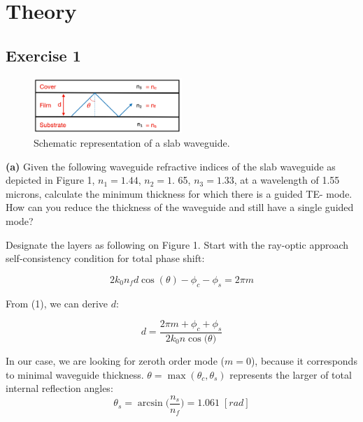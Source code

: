 \documentclass[11pt,a4paper]{article}
\begin{document}
 

\section{Theory}

\subsection*{Exercise 1}


\begin{figure}[ht]
    \centering
    \includegraphics[width=0.5\textwidth]{fig_1.png}
    \caption{Schematic representation of a slab waveguide.}
\end{figure}


\begin{displayquote}
\textbf{(a)} Given the following waveguide refractive indices of the slab waveguide as 
depicted in Figure 1, $n_1=1.44$, $n_2=1$. 65, $n_3=1.33$, at a wavelength of 1.55 microns, 
calculate the minimum thickness for which there is a guided TE- mode. How can 
you reduce the thickness of the waveguide and still have a single guided mode? 
\end{displayquote}

Designate the layers as following on Figure 1. Start with the ray-optic approach 
self-consistency condition for total phase shift: 

\begin{equation}
    2k_{0} n_{f} d{} \cos{(\theta)}-\phi_{c} - \phi_{s} = 2 \pi{} m
\end{equation}

From (1), we can derive $d$:

\begin{equation}
    d = \frac{2\pi m + \phi_c + \phi_s}{2 k_0 n \cos{(\theta})}
\end{equation}

In our case, we are looking for zeroth order mode ($m=0$), because it corresponds to minimal waveguide thickness. $\theta=\max{(\theta_c,\theta_s)}$ represents the larger of total internal reflection angles: 
\begin{equation*}
    \theta_s=\arcsin{\Big(\frac{n_s}{n_f}}\Big)=1.061 \;[rad]   
\end{equation*}
\end{document}
